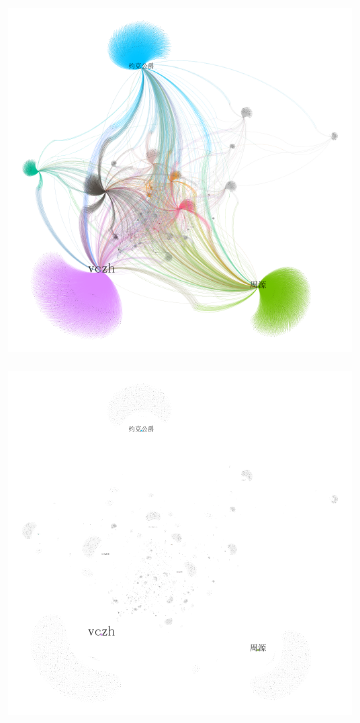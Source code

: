 \documentclass[bachelor,adobefonts]{jnuthesis}
\begin{document}
\begin{figure}[h!]
  \centering
  \begin{subfigure}[b]{0.4\linewidth}
    \includegraphics[width=\linewidth]{Gephi1.png}
    \caption{}
  \end{subfigure}
  \begin{subfigure}[b]{0.4\linewidth}
    \includegraphics[width=\linewidth]{Gephi5.png}

\end{subfigure}
\end{figure}
\end{document}
